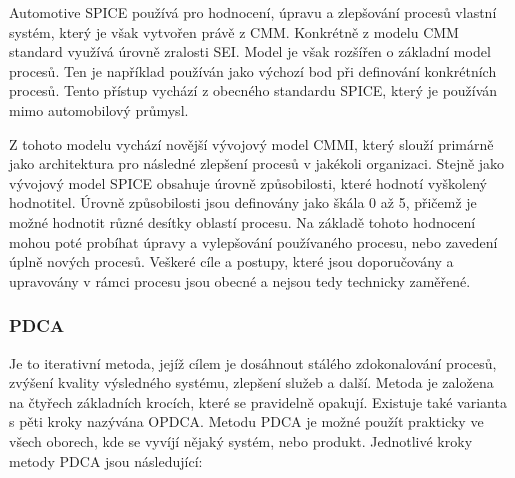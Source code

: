 \documentclass[czech,master,public,dept460,male,cpdeclaration,oneside]{diploma}
\begin{document}
Automotive SPICE používá pro hodnocení, úpravu a zlepšování procesů vlastní systém, který je však vytvořen právě z CMM. Konkrétně z modelu CMM standard využívá úrovně zralosti SEI. Model je však rozšířen o základní model procesů. Ten je například používán jako výchozí bod při definování konkrétních procesů. Tento přístup vychází z obecného standardu SPICE, který je používán mimo automobilový průmysl.

Z tohoto modelu vychází novější vývojový model CMMI, který slouží primárně jako architektura pro následné zlepšení procesů v jakékoli organizaci. Stejně jako vývojový model SPICE obsahuje úrovně způsobilosti, které hodnotí vyškolený hodnotitel. Úrovně způsobilosti jsou definovány jako škála 0 až 5, přičemž je možné hodnotit různé desítky oblastí procesu. Na základě tohoto hodnocení mohou poté probíhat úpravy a vylepšování používaného procesu, nebo zavedení úplně nových procesů. Veškeré cíle a postupy, které jsou doporučovány a upravovány v rámci procesu jsou obecné a nejsou tedy technicky zaměřené.

\subsubsection{PDCA}
Je to iterativní metoda, jejíž cílem je dosáhnout stálého zdokonalování procesů, zvýšení kvality výsledného systému, zlepšení služeb a další. Metoda je založena na čtyřech základních krocích, které se pravidelně opakují. Existuje také varianta s pěti kroky nazývána OPDCA. Metodu PDCA je možné použít prakticky ve všech oborech, kde se vyvíjí nějaký systém, nebo produkt.  Jednotlivé kroky metody PDCA jsou následující:
\end{document}
